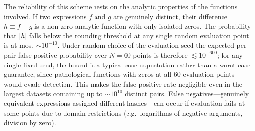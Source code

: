 \documentclass[preprint,12pt,authoryear]{elsarticle}
\newcommand{\hd}[1]{{\color{red}\textbf{[HD: #1]}}}
\begin{document}
The reliability of this scheme rests on the analytic properties of the functions involved. If two expressions $f$ and $g$ are genuinely distinct, their difference $h \equiv f - g$ is a non-zero analytic function with only isolated zeros. The probability that $|h|$ falls below the rounding threshold at any single random evaluation point is at most ${\sim}10^{-10}$. Under random choice of the evaluation seed the expected per-pair false-positive probability over $N = 60$ points is therefore $\lesssim 10^{-600}$; for any single fixed seed, the bound is a typical-case expectation rather than a worst-case guarantee, since pathological functions with zeros at all 60 evaluation points would evade detection. This makes the false-positive rate negligible even in the largest datasets containing up to ${\sim}10^{10}$ distinct pairs.
False negatives---genuinely equivalent expressions assigned different hashes---can occur if evaluation fails at some points due to domain restrictions (e.g.\ logarithms of negative arguments, division by zero).
\end{document}
